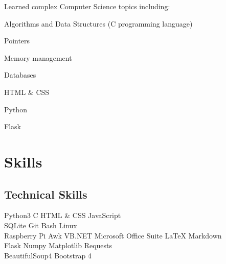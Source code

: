 \documentclass[]{deedy-resume-openfont}
\begin{document}
\begin{minipage}[t]{0.33\textwidth}
    Learned complex Computer Science topics including: \\
    \begin{tightemize}
        \item Algorithms and Data Structures (C programming language)
        \item Pointers
        \item Memory management
        \item Databases
        \item HTML \& CSS
        \item Python
        \item Flask
    \end{tightemize}
    \sectionsep



    \section{Skills}
    \subsection{Technical Skills}
    Python3 \textbullet{}   C \textbullet{} HTML \& CSS \textbullet{} JavaScript \\
    SQLite \textbullet{} Git \textbullet{} Bash \textbullet{} Linux \\
    Raspberry Pi \textbullet{} Awk \textbullet{} VB.NET \textbullet{} Microsoft Office Suite \textbullet{} LaTeX \textbullet{} Markdown \\

    Flask \textbullet{} Numpy \textbullet{} Matplotlib \textbullet{} Requests \\ BeautifulSoup4 \textbullet{} Bootstrap 4 \\
    \sectionsep


\end{minipage}
\end{document}
